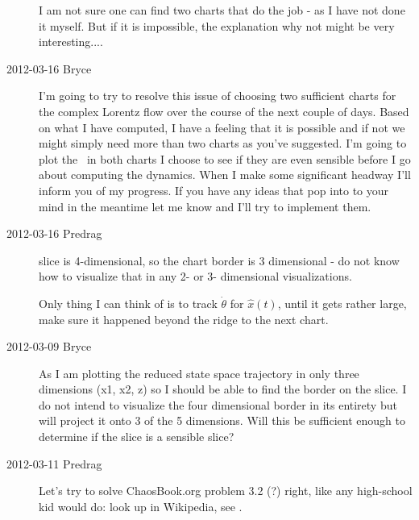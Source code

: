 \begin{description}
I am not sure one can find two charts that do the job - as I have not
done it myself. But if it is impossible, the explanation why not might be
very interesting....

\item[2012-03-16 Bryce]
I'm going to try to resolve this issue of choosing two sufficient charts
for the complex Lorentz flow over the course of the next couple of days.
Based on what I have computed, I have a feeling that it is possible and
if not we might simply need more than two charts as you've suggested. I'm
going to plot the \chartBord\ in both charts I choose to see
if they are even sensible before I go about computing the dynamics. When
I make some significant headway I'll inform you of my progress. If you
have any ideas that pop into to your mind in the meantime let me know and
I'll try to implement them.

\item[2012-03-16 Predrag]
slice is 4-dimensional, so the chart border is 3 dimensional - do not
know how to visualize that in any 2- or 3- dimensional visualizations.

Only thing I can think of is to track $\dot{\theta}$ for $\hat{x}(t)$,
until it gets rather large, make sure it happened beyond the ridge to the
next chart.

\item[2012-03-09 Bryce]
As I am plotting the reduced state space trajectory in only three
dimensions (x1, x2, z) so I should be able to find the border on the
slice. I do not intend to visualize the four dimensional border in its
entirety but will project it onto 3 of the 5 dimensions. Will this be
sufficient enough to determine if the slice is a sensible slice?


\item[2012-03-11 Predrag]
Let's try to solve ChaosBook.org problem 3.2 (?) right, like any
high-school kid would do: look up
 in
Wikipedia, see .


\end{description}
